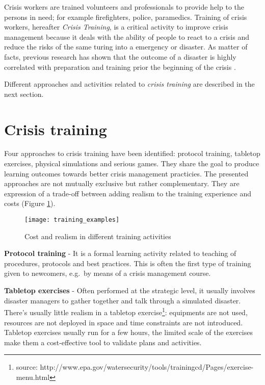 Crisis workers are trained volunteers and professionals to provide help to the persons in need; for example firefighters, police, paramedics. Training of crisis workers, hereafter \emph{Crisis Training}, is a critical activity to improve crisis management because it deals with the ability of people to react to a crisis and reduce the risks of the same turing into a emergency or disaster. As matter of facts, previous research has shown that the outcome of a disaster is highly correlated with preparation and training prior the beginning of the crisis \autocite{Asproth:cb}.

Different approaches and activities related to \emph{crisis training} are described in the next section.

\section{Crisis training}\label{crisis-training}

Four approaches to crisis training have been identified: protocol training, tabletop exercises, physical simulations and serious games. They share the goal to produce learning outcomes towards better crisis management practicies. The presented approaches are not mutually exclusive but rather complementary. They are expression of a trade-off between adding realism to the training experience and costs (Figure \ref{fig:training-activities}).

\begin{figure}
	[h!] \centering 
	\texttt{[image: training\_examples]} 
	\caption{Cost and realism in different training activities} 
	\label{fig:training-activities} 
\end{figure}

\textbf{Protocol training} - It is a formal learning activity related to teaching of procedures, protocols and best practices. This is often the first type of training given to newcomers, e.g.~by means of a crisis management course.

\textbf{Tabletop exercises} - Often performed at the strategic level, it usually involves disaster managers to gather together and talk through a simulated disaster. There's usually little realism in a tabletop exercise\footnote{source: http://www.epa.gov/watersecurity/tools/trainingcd/Pages/exercise-menu.html}: equipments are not used, resources are not deployed in space and time constraints are not introduced. Tabletop exercises usually run for a few hours, the limited scale of the exercises make them a cost-effective tool to validate plans and activities.

